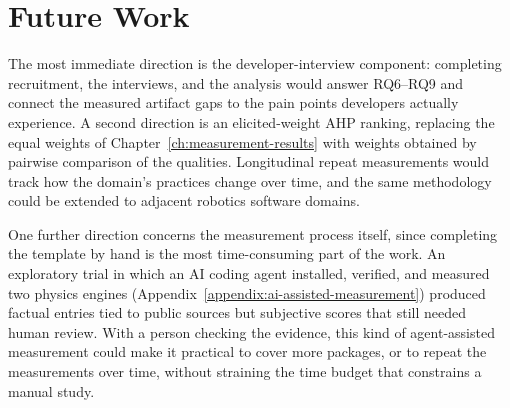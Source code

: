 \section{Future Work}
\label{sec:future-work}

The most immediate direction is the developer-interview component: completing
recruitment, the interviews, and the analysis would answer RQ6--RQ9 and connect the measured artifact gaps to the
pain points developers actually experience.
A second direction is an elicited-weight AHP ranking, replacing the equal weights
of Chapter~\ref{ch:measurement-results} with weights obtained by pairwise
comparison of the qualities. Longitudinal repeat measurements would track how the
domain's practices change over time, and the same methodology could be extended
to adjacent robotics software domains.

One further direction concerns the measurement process itself, since completing
the template by hand is the most time-consuming part of the work. An exploratory
trial in which an AI coding agent installed, verified, and measured two physics
engines (Appendix~\ref{appendix:ai-assisted-measurement}) produced factual
entries tied to public sources but subjective scores that still needed human
review. With a person checking the evidence, this kind of agent-assisted
measurement could make it practical to cover more packages, or to repeat the
measurements over time, without straining the time budget that constrains a
manual study.
